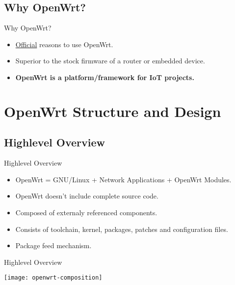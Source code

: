 \subsection{Why OpenWrt?}
\begin{frame}{Why OpenWrt?}
    \begin{itemize}[<+(1)->]
        \item \href{https://openwrt.org/reasons_to_use_lede}{Official} reasons to use OpenWrt.
        \item Superior to the stock firmware of a router or embedded device.
        \item \textbf{OpenWrt is a platform/framework for IoT projects.}
    \end{itemize}
\end{frame}

\section{OpenWrt Structure and Design}

\subsection{Highlevel Overview}
\begin{frame}{Highlevel Overview}
    \begin{itemize}[<+(1)->]
        \item OpenWrt = GNU/Linux + Network Applications + OpenWrt Modules.
        \item OpenWrt doesn't include complete source code.
        \item Composed of externaly referenced components.
        \item Consists of toolchain, kernel, packages, patches and configuration files.
        \item Package feed mechanism.
    \end{itemize}
\end{frame}

\begin{frame}{Highlevel Overview}
    \centerline{\texttt{[image: openwrt-composition]}}
\end{frame}

